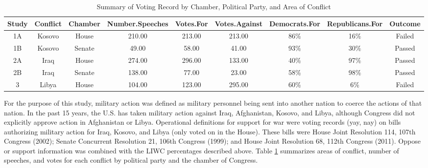 \documentclass[
  english,
  ,man,floatsintext]{apa6}
\begin{document}
\begin{table}[tbp]

\begin{center}
\begin{threeparttable}

\caption{\label{tab:summary-table}Summary of Voting Record by Chamber, Political Party, and Area of Conflict}

\begin{tabular}{ccccccccc}
\toprule
Study & \multicolumn{1}{c}{Conflict} & \multicolumn{1}{c}{Chamber} & \multicolumn{1}{c}{Number.Speeches} & \multicolumn{1}{c}{Votes.For} & \multicolumn{1}{c}{Votes.Against} & \multicolumn{1}{c}{Democrats.For} & \multicolumn{1}{c}{Republicans.For} & \multicolumn{1}{c}{Outcome}\\
\midrule
1A & Kosovo & House & 210.00 & 213.00 & 213.00 & 86\% & 16\% & Failed\\
1B & Kosovo & Senate & 49.00 & 58.00 & 41.00 & 93\% & 30\% & Passed\\
2A & Iraq & House & 274.00 & 296.00 & 133.00 & 40\% & 97\% & Passed\\
2B & Iraq & Senate & 138.00 & 77.00 & 23.00 & 58\% & 98\% & Passed\\
3 & Libya & House & 104.00 & 123.00 & 295.00 & 60\% & 6\% & Failed\\
\bottomrule
\end{tabular}

\end{threeparttable}
\end{center}

\end{table}

For the purpose of this study, military action was defined as military personnel being sent into another nation to coerce the actions of that nation. In the past 15 years, the U.S. has taken military action against Iraq, Afghanistan, Kosovo, and Libya, although Congress did not explicitly approve action in Afghanistan or Libya. Operational definitions for support for war were voting records (yay, nay) on bills authorizing military action for Iraq, Kosovo, and Libya (only voted on in the House). These bills were House Joint Resolution 114, 107th Congress (2002); Senate Concurrent Resolution 21, 106th Congress (1999); and House Joint Resolution 68, 112th Congress (2011). Oppose or support information was combined with the LIWC percentages described above. Table \ref{tab:summary-table} summarizes areas of conflict, number of speeches, and votes for each conflict by political party and the chamber of Congress.
\end{document}
